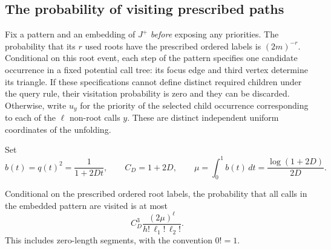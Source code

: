 \subsection{The probability of visiting prescribed paths}

Fix a pattern and an embedding of $J^+$ \emph{before} exposing any
priorities. The probability that its $r$ used roots have the prescribed
ordered labels is $(2m)^{-r}$. Conditional on this root event, each step
of the pattern specifies one candidate occurrence in a fixed potential
call tree: its focus edge and third vertex determine its triangle.
If these specifications cannot define distinct required children under
the query rule, their visitation probability is zero and they can be
discarded. Otherwise, write $u_y$ for the priority of the selected child
occurrence corresponding to each of the $\ell$ non-root calls $y$.
These are distinct independent uniform coordinates of the unfolding.

Set
\begin{equation}\label{eq:visitation-weights}
 b(t)=q(t)^2=\frac{1}{1+2Dt},\qquad
 C_D=1+2D,\qquad
 \mu=\int_0^1b(t)\,dt=\frac{\log(1+2D)}{2D}.
\end{equation}

\begin{lemma}\label{lem:visitation}
Conditional on the prescribed ordered root labels, the probability that
all calls in the embedded pattern are visited is at most
\begin{equation}\label{eq:visitation-bound}
 C_D^3\frac{(2\mu)^\ell}{h!\,\ell_1!\,\ell_2!}.
\end{equation}
This includes zero-length segments, with the convention $0!=1$.
\end{lemma}

